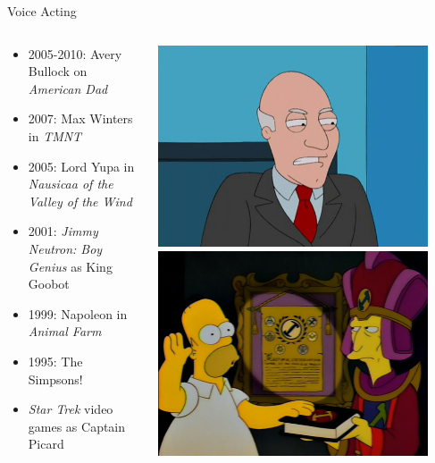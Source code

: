 \documentclass[xcolor=dvipsnames]{beamer}
\begin{document}
\begin{frame}{Voice Acting}
  \begin{columns}
    \begin{column}{0.7\textwidth}
      \begin{itemize} 
        \item 2005-2010: Avery Bullock on \emph{American Dad}
        \item 2007: Max Winters in \emph{TMNT}
        \item 2005: Lord Yupa in \emph{Nausicaa of the Valley of the Wind}
        \item 2001: \emph{Jimmy Neutron: Boy Genius} as King Goobot
        \item 1999: Napoleon in \emph{Animal Farm}
        \item 1995: The Simpsons!
        \item \emph{Star Trek} video games as Captain Picard
      \end{itemize}
    \end{column}
    \begin{column}{0.3\textwidth}
      \includegraphics[width=0.9\textwidth]{Bullock.jpg} \newline
      \includegraphics[width=0.9\textwidth]{HomertheGreat.png}
    \end{column}
  \end{columns}
\end{frame}
\end{document}
